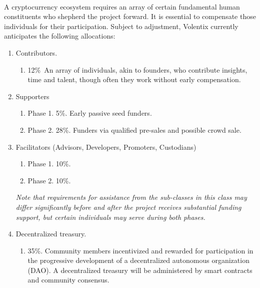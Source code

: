 \documentclass[]{article}
\begin{document}
{\paragraph {}
A cryptocurrency ecosystem requires an array of certain fundamental human constituents who shepherd the project forward. \cite{27}   It is essential to compensate those individuals for their participation. Subject to adjustment, Volentix currently anticipates the following allocations:  
\begin{enumerate}
	\item Contributors. 
	\begin{enumerate}
		\item  12\%\ An array of individuals, akin to founders, who contribute insights, time and talent, though often they work without early compensation. 
	\end{enumerate}
	
	\item Supporters\
	\begin{enumerate}
		\item Phase 1. 5\%. Early passive seed funders.
		\item Phase 2. 28\%. Funders via qualified pre-sales and possible crowd sale.  
	\end{enumerate}
	\item {Facilitators} 
	(Advisors, Developers, Promoters, Custodians)\
	\begin{enumerate}
		\item Phase 1. 10\%. 
		\item Phase 2. 10\%. \
	\end{enumerate}
	\textit{Note that requirements for assistance from the sub-classes in this class may differ significantly before and after the project receives substantial funding support, but certain individuals may serve during both phases. }
	\item Decentralized treasury. 
	\begin{enumerate}
		\item 35\%. Community members incentivized and rewarded for participation in the progressive development of a decentralized autonomous organization (DAO). A decentralized treasury will be administered by smart contracts and community consensus.
		
	\end{enumerate}
	
	
	
\end{enumerate}

}
\end{document}
